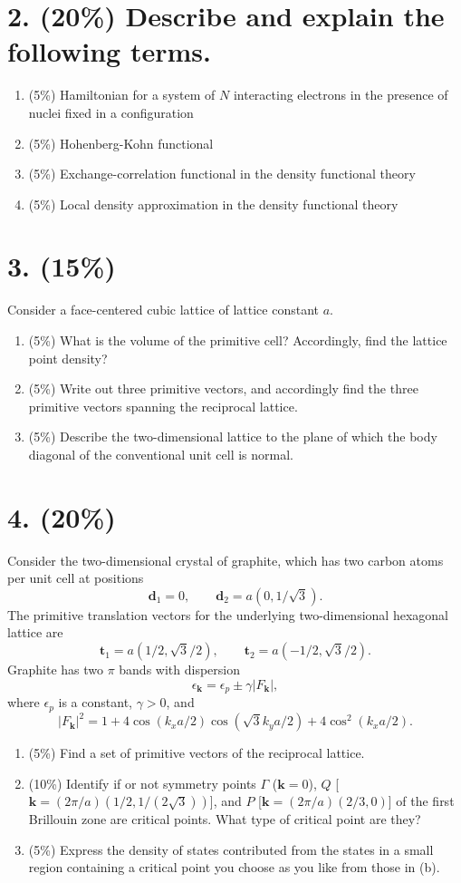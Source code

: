 \section*{2. (20\%) Describe and explain the following terms.}
\begin{enumerate}[label=(\alph*)]
\item (5\%) Hamiltonian for a system of $N$ interacting electrons in the presence of nuclei fixed in a configuration
\item (5\%) Hohenberg-Kohn functional
\item (5\%) Exchange-correlation functional in the density functional theory
\item (5\%) Local density approximation in the density functional theory
\end{enumerate}

\section*{3. (15\%)}
Consider a face-centered cubic lattice of lattice constant $a$.
\begin{enumerate}[label=(\alph*)]
\item (5\%) What is the volume of the primitive cell? Accordingly, find the lattice point density?
\item (5\%) Write out three primitive vectors, and accordingly find the three primitive vectors spanning the reciprocal lattice.
\item (5\%) Describe the two-dimensional lattice to the plane of which the body diagonal of the conventional unit cell is normal.
\end{enumerate}

\section*{4. (20\%)}
Consider the two-dimensional crystal of graphite, which has two carbon atoms per unit cell at positions
\[
\mathbf d_1=0,\qquad \mathbf d_2=a(0,1/\sqrt3).
\]
The primitive translation vectors for the underlying two-dimensional hexagonal lattice are
\[
\mathbf t_1=a(1/2,\sqrt3/2),\qquad
\mathbf t_2=a(-1/2,\sqrt3/2).
\]
Graphite has two $\pi$ bands with dispersion
\[
\epsilon_{\mathbf k}=\epsilon_p\pm\gamma|F_{\mathbf k}|,
\]
where $\epsilon_p$ is a constant, $\gamma>0$, and
\[
|F_{\mathbf k}|^2=1+4\cos(k_xa/2)\cos(\sqrt3k_ya/2)
                   +4\cos^2(k_xa/2).
\]
\begin{enumerate}[label=(\alph*)]
\item (5\%) Find a set of primitive vectors of the reciprocal lattice.
\item (10\%) Identify if or not symmetry points $\Gamma$ ($\mathbf k=0$), $Q$ [$\mathbf k=(2\pi/a)(1/2,1/(2\sqrt3))$], and $P$ [$\mathbf k=(2\pi/a)(2/3,0)$] of the first Brillouin zone are critical points. What type of critical point are they?
\item (5\%) Express the density of states contributed from the states in a small region containing a critical point you choose as you like from those in (b).
\end{enumerate}
